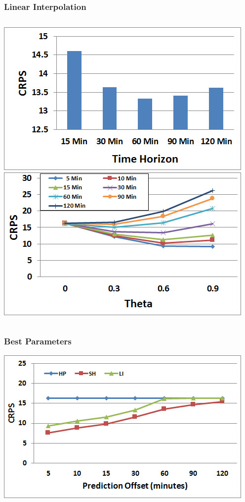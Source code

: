 \documentclass[t]{beamer}
\begin{document}
\begin{frame}\frametitle{Linear Interpolation}
\vspace{0.5in}
\begin{columns}
		\includegraphics[scale=0.3]{Links_Interpolated_TimeHorizon.jpg}
		\includegraphics[scale=0.3]{Links_Interpolated_Theta.jpg}
\end{columns}
\end{frame}

\begin{frame}\frametitle{Best Parameters}
\begin{center}
	\includegraphics[scale=0.5]{Links_Best.jpg}
\end{center}
\end{frame}
\end{document}
